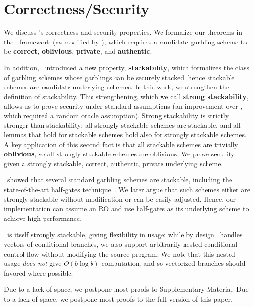 \section{\ourschemelong Correctness/Security}\label{sec:proof}

We discuss \ourschemelong's correctness and security properties.
We formalize our theorems in the~\cite{CCS:BelHoaRog12} framework (as
modified by \HK),
which requires a candidate garbling scheme to be \textbf{correct},
\textbf{oblivious}, \textbf{private}, and \textbf{authentic}.

In addition, \HK\ introduced a new property, \textbf{stackability}, which
formalizes the class of garbling schemes whose garblings can be
securely stacked; hence stackable schemes are candidate underlying
schemes.
%
In this work, we strengthen the definition of stackability.  This
strengthening, which we call \textbf{strong stackability}, allows us to
prove security under standard assumptions (an improvement over \HK,
which required a random oracle assumption).
Strong stackability is strictly stronger than stackability: all
strongly
stackable schemes are stackable,
and all lemmas that hold for stackable schemes hold also for strongly
stackable schemes.
A key application of this second fact is that all stackable schemes
are trivially \textbf{oblivious}, so all strongly stackable schemes are
oblivious.
We prove security given a strongly stackable, correct, authentic,
private underlying scheme.

\HK\ showed that several standard garbling schemes are stackable, including
the state-of-the-art half-gates technique~\cite{EC:ZahRosEva15}.
We later argue that such schemes either are strongly stackable without
modification or can be easily adjusted.
Hence, our implementation can assume an RO and use half-gates as its underlying
scheme to achieve high performance.

\ourschemelong\ is itself strongly stackable, giving
flexibility in usage: while by design \ourschemelong\ handles vectors
of conditional branches, we also support arbitrarily nested
conditional control flow without modifying the source program.
%
We note that this nested usage \emph{does not} give $O(b\log b)$
computation, and so vectorized branches should favored where possible.

\iffull
Due to a lack of space, we postpone most proofs to Supplementary
Material.
\else
Due to a lack of space, we postpone most proofs to the full version of
this paper.
\fi



